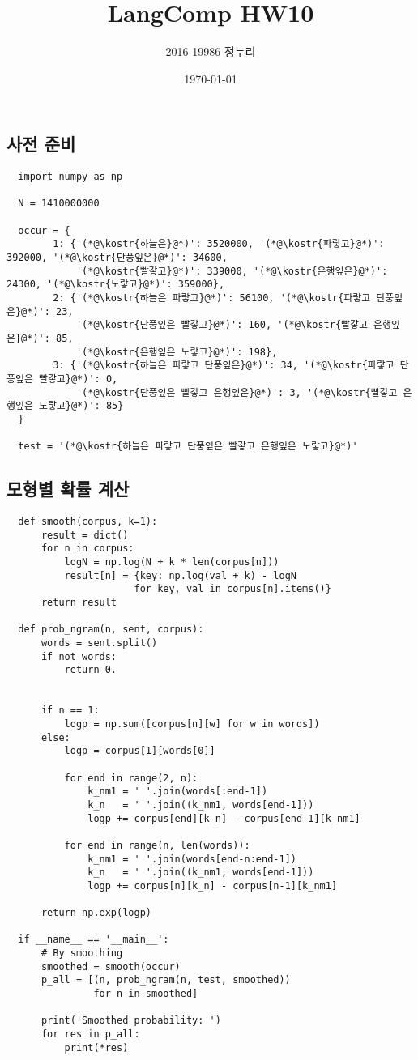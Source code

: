 \documentclass[a4paper,11pt]{scrartcl}
\title{\vspace{-0.5in}LangComp HW10}
\author{\vspace{-15pt}2016-19986 정누리}
\date{\vspace{-5pt}\today}
\newcommand{\kostr}[1]{\textcolor{stringcolor}{#1}}
\begin{document}
\maketitle

\setcounter{section}{1}
\setcounter{subsection}{-1}
\subsection{사전 준비}
\begin{lstlisting}
  import numpy as np

  N = 1410000000

  occur = {
        1: {'(*@\kostr{하늘은}@*)': 3520000, '(*@\kostr{파랗고}@*)': 392000, '(*@\kostr{단풍잎은}@*)': 34600,
            '(*@\kostr{빨갛고}@*)': 339000, '(*@\kostr{은행잎은}@*)': 24300, '(*@\kostr{노랗고}@*)': 359000},
        2: {'(*@\kostr{하늘은 파랗고}@*)': 56100, '(*@\kostr{파랗고 단풍잎은}@*)': 23,
            '(*@\kostr{단풍잎은 빨갛고}@*)': 160, '(*@\kostr{빨갛고 은행잎은}@*)': 85,
            '(*@\kostr{은행잎은 노랗고}@*)': 198},
        3: {'(*@\kostr{하늘은 파랗고 단풍잎은}@*)': 34, '(*@\kostr{파랗고 단풍잎은 빨갛고}@*)': 0,
            '(*@\kostr{단풍잎은 빨갛고 은행잎은}@*)': 3, '(*@\kostr{빨갛고 은행잎은 노랗고}@*)': 85}
  }

  test = '(*@\kostr{하늘은 파랗고 단풍잎은 빨갛고 은행잎은 노랗고}@*)'
\end{lstlisting}

\subsection{모형별 확률 계산}
\begin{lstlisting}
  def smooth(corpus, k=1):
      result = dict()
      for n in corpus:
          logN = np.log(N + k * len(corpus[n]))
          result[n] = {key: np.log(val + k) - logN
                      for key, val in corpus[n].items()}
      return result

  def prob_ngram(n, sent, corpus):
      words = sent.split()
      if not words:
          return 0.


      if n == 1:
          logp = np.sum([corpus[n][w] for w in words])
      else:
          logp = corpus[1][words[0]]

          for end in range(2, n):
              k_nm1 = ' '.join(words[:end-1])
              k_n   = ' '.join((k_nm1, words[end-1]))
              logp += corpus[end][k_n] - corpus[end-1][k_nm1]

          for end in range(n, len(words)):
              k_nm1 = ' '.join(words[end-n:end-1])
              k_n   = ' '.join((k_nm1, words[end-1]))
              logp += corpus[n][k_n] - corpus[n-1][k_nm1]

      return np.exp(logp)

  if __name__ == '__main__':
      # By smoothing
      smoothed = smooth(occur)
      p_all = [(n, prob_ngram(n, test, smoothed))
               for n in smoothed]

      print('Smoothed probability: ')
      for res in p_all:
          print(*res)
\end{lstlisting}
\end{document}
